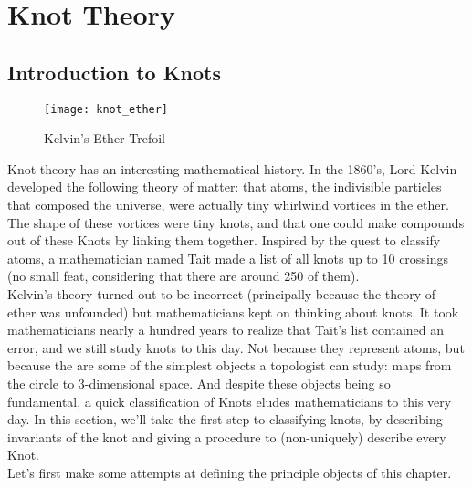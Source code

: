 \leavevmode\thispagestyle{empty}\newpage
{}

\chapter{Knot Theory}
\section{Introduction to Knots}
\begin{wrapfigure}{l}{7cm}\texttt{[image: knot\_ether]} \caption{Kelvin's Ether Trefoil}
\end{wrapfigure}  Knot theory has an interesting mathematical history. In the 1860's, Lord Kelvin developed  the following theory of matter: that atoms, the  indivisible particles that composed the universe, were  actually tiny whirlwind vortices in the ether. The  shape of these vortices were tiny knots, and that one could make compounds out of these Knots by linking  them together. Inspired by the quest to classify  atoms, a mathematician named Tait made a list of  all knots up to 10 crossings (no small feat,  considering that there are around 250 of them).\\

Kelvin's theory turned out to be incorrect (principally because the theory of ether was unfounded) but mathematicians  kept on thinking about knots, It took mathematicians nearly a hundred  years to realize that Tait's list contained an error, and we still study knots to this day. Not because they represent  atoms, but because the are some of the simplest objects a  topologist can study: maps from the circle to 3-dimensional  space. And despite these objects being so fundamental,  a quick classification of Knots eludes mathematicians to this  very day. In this section, we'll take the first step to classifying  knots, by describing invariants of the knot and giving a  procedure to (non-uniquely) describe every Knot.\\
Let's first make some attempts at defining the principle objects of this chapter.
